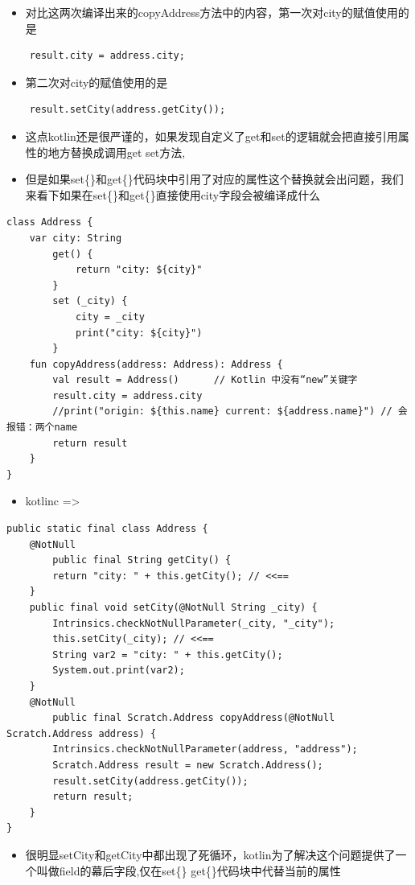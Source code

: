 \documentclass[9pt, b5paper]{article}
\begin{document}
\begin{itemize}
\item 对比这两次编译出来的copyAddress方法中的内容，第一次对city的赋值使用的是
\end{itemize}
\begin{verbatim}
    result.city = address.city;
\end{verbatim}
\begin{itemize}
\item 第二次对city的赋值使用的是
\end{itemize}
\begin{verbatim}
    result.setCity(address.getCity());
\end{verbatim}
\begin{itemize}
\item 这点kotlin还是很严谨的，如果发现自定义了get和set的逻辑就会把直接引用属性的地方替换成调用get set方法,
\item 但是如果set\{\}和get\{\}代码块中引用了对应的属性这个替换就会出问题，我们来看下如果在set\{\}和get\{\}直接使用city字段会被编译成什么
\end{itemize}
\begin{verbatim}
class Address {
    var city: String
        get() {
            return "city: ${city}"
        }
        set (_city) {
            city = _city
            print("city: ${city}")
        }
    fun copyAddress(address: Address): Address {
        val result = Address()      // Kotlin 中没有“new”关键字
        result.city = address.city
        //print("origin: ${this.name} current: ${address.name}") // 会报错：两个name
        return result
    }
}
\end{verbatim}
\begin{itemize}
\item kotlinc =>
\end{itemize}
\begin{verbatim}
public static final class Address {
    @NotNull
        public final String getCity() {
        return "city: " + this.getCity(); // <<==
    }
    public final void setCity(@NotNull String _city) {
        Intrinsics.checkNotNullParameter(_city, "_city");
        this.setCity(_city); // <<==
        String var2 = "city: " + this.getCity();
        System.out.print(var2);
    }
    @NotNull
        public final Scratch.Address copyAddress(@NotNull Scratch.Address address) {
        Intrinsics.checkNotNullParameter(address, "address");
        Scratch.Address result = new Scratch.Address();
        result.setCity(address.getCity());
        return result;
    }
}
\end{verbatim}
\begin{itemize}
\item 很明显setCity和getCity中都出现了死循环，kotlin为了解决这个问题提供了一个叫做field的幕后字段,仅在set\{\} get\{\}代码块中代替当前的属性
\end{itemize}
\end{document}
